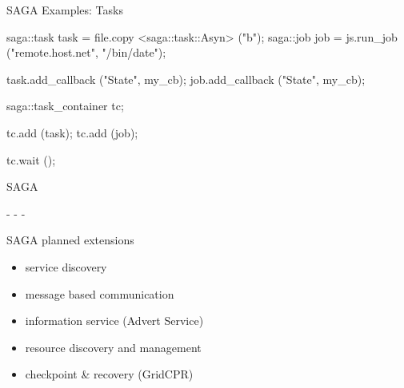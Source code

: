\documentclass[%
  pdf,
  colorBG,
  slideColor,
  frames,
  ogf
]{prosper}
\newcommand{\dn}{\vspace*{+1em}}
\begin{document}

 \begin{slide}{SAGA Examples: Tasks}

  \begin{mycode}[label=tasks and jobs]

  saga::task task = file.copy <saga::task::Asyn> ("b");
  saga::job  job  = js.run_job ("remote.host.net", "/bin/date");
  
  task.add_callback ("State", my_cb);
  job.add_callback  ("State", my_cb);

  saga::task_container tc;

  tc.add (task);
  tc.add (job);

  tc.wait ();

  \end{mycode}
   
 \end{slide}

 
 
 \begin{slide}{SAGA}
 
  \dn\dn\dn\dn\dn
 
  \begin{center}
   \Large - - - 
  \end{center}
 
 \end{slide}
 

 \begin{slide}{SAGA planned extensions}
 \dn
  \begin{itemize}
   \item service discovery\\
   \item message based communication\\
   \item information service (Advert Service)\\
   \item resource discovery and management\\
   \item checkpoint \& recovery (GridCPR)\\
  \end{itemize}
 \end{slide}

\end{document}

